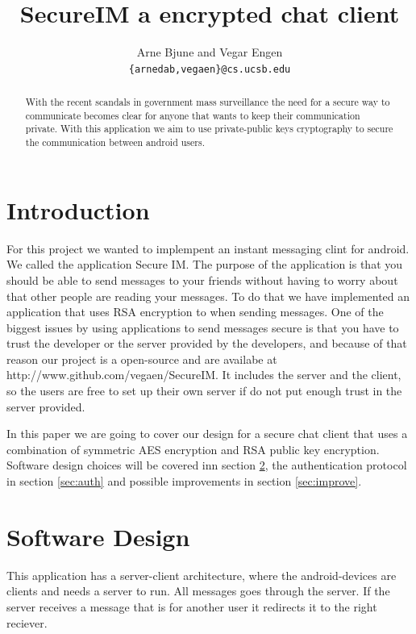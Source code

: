 \documentclass[twocolumn,11pt]{IEEEtran}
\begin{document}
\title{SecureIM a encrypted chat client}


\author{Arne Bjune and Vegar Engen \\ \texttt{\{arnedab,vegaen\}@cs.ucsb.edu}}


\maketitle

\begin{abstract}
With the recent scandals in government mass surveillance the need for a secure way to communicate becomes clear for anyone that wants to keep their communication private. With this application we aim to use private-public
 keys cryptography to secure the communication between android users. \end{abstract}

\section {Introduction}
\label{sec:introduction}
For this project we wanted to implempent an instant messaging clint for android. We called the application Secure IM. The purpose of the application is that you should be able to send messages to your friends without having to worry about that other people are reading your messages. To do that we have implemented an application that uses RSA encryption to when sending messages. One of the biggest issues by using applications to send messages secure is that you have to trust the developer or the server provided by the developers, and because of that reason our project is a open-source and are availabe at http://www.github.com/vegaen/SecureIM. It includes the server and the client, so the users are free to set up their own server if do not put enough trust in the server provided. 


In this paper we are going to cover our design for a secure chat client that uses a combination of symmetric AES encryption and RSA public key encryption. Software design choices will be covered inn section \ref{sec:design}, the authentication protocol in section \ref{sec:auth} and possible improvements in section \ref{sec:improve}. 


\section {Software Design}
\label{sec:design}
This application has a server-client architecture, where the android-devices are clients and needs a server to run. All messages goes through the server. If the server receives a message that is for another user it redirects it to the right reciever.
\end{document}
